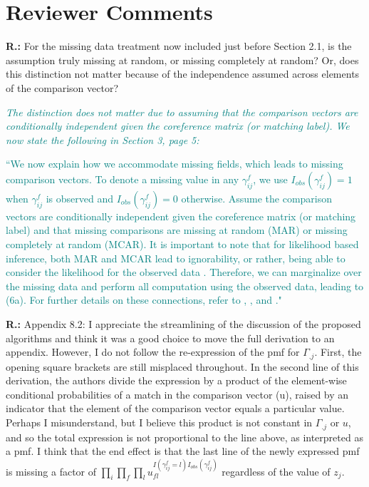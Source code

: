 \documentclass[letterpaper, parskip]{scrartcl}
\newcommand{\pointRaised}[2]{%
	\textbf{#1.\theresponsectr:} #2
}
\newcounter{responsectr}[section]     %
\newcommand{\reply}[1]{%
	\refstepcounter{responsectr}%
		\begin{tcolorbox}
			\itshape #1
		\end{tcolorbox}
}
\begin{document}
\setcounter{responsectr}{0}
\section{Reviewer Comments}

	\pointRaised{R}{%
	For the missing data treatment now included just before Section 2.1, is the assumption truly missing at random, or missing completely at random? Or, does this distinction not matter because of the independence assumed across elements of the comparison vector?}
	
	
	\reply{\textcolor{teal}{The distinction does not matter due to assuming that the comparison vectors are conditionally independent given the coreference matrix (or matching label). We now state the following in Section 3, page 5:}
	
	\textcolor{teal}{``\textcolor{teal}{We now explain how we accommodate missing fields, which leads to missing comparison vectors. To denote a missing value in any $\gamma_{ij}^f$, we use $I_{obs}(\gamma_{ij}^f)=1$ when $\gamma_{ij}^f$ is observed and $I_{obs}(\gamma_{ij}^f)=0$ otherwise. Assume the comparison vectors are conditionally independent given the coreference matrix (or matching label) and that missing comparisons are missing at random (MAR) or missing completely at random (MCAR). It is important to note that for likelihood based inference, both MAR and MCAR lead to ignorability, or rather, being able to consider the likelihood for the observed data \citep[Section 6.2]{LittleRubin2002}. Therefore, we can marginalize over the missing data and perform all computation using the observed data, leading to (6a). For further details on these connections, refer to \cite[Section 6.2]{LittleRubin2002}, \cite[Section 3.1]{sadinle_detecting_2014}, and \citep[Section 4.2]{sadinle_bayesian_2017}}."}
	}
	
	

	
	


	\pointRaised{R}{%
	Appendix 8.2: I appreciate the streamlining of the discussion of the proposed algorithms and think it was a good choice to move the full derivation to an appendix. However, I do not follow the re-expression of the pmf for $\Gamma_{.j}$. First, the opening square brackets are still misplaced
	throughout. In the second line of this derivation, the authors divide the expression by a product of the element-wise conditional probabilities of a match in the comparison vector (u), raised by an indicator that the element of the comparison vector equals a particular value. Perhaps I misunderstand, but I believe this product is not constant in $\Gamma_{.j}$ or $u$, and so the total expression is not proportional to the line above, as interpreted as a pmf. I think that the end effect is that the last line of the newly expressed pmf is missing a factor of $\prod_i \prod_f \prod_l u_{fl}^{I(\gamma_{ij}^f = l) I_{obs}(\gamma_{ij}^f)}$ regardless of the value of $z_j$.}
	
\end{document}
